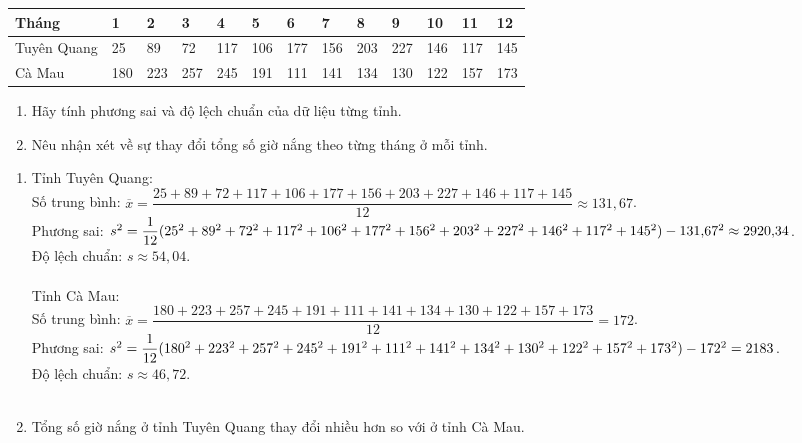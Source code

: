 \begin{bt}%
	\begin{center}
		\begin{tabular}{|m{1.5cm}|m{.4cm}|m{.4cm}|m{.4cm}|m{.4cm}|m{.4cm}|m{.4cm}|m{.4cm}|m{.4cm}|m{.4cm}|m{.4cm}|m{.4cm}|m{.4cm}|}
			\hline
			Tháng & 1 & 2 & 3 & 4 & 5 & 6 & 7 & 8 & 9 & 10 & 11 & 12 \\
			\hline
			Tuyên Quang & 25 & 89 & 72 & 117 & 106 & 177 & 156 & 203 & 227 & 146 & 117 & 145 \\
			\hline
			Cà Mau & 180 & 223 & 257 & 245 & 191 & 111 & 141 & 134 & 130 & 122 & 157 & 173 \\
			\hline
		\end{tabular} 
	\end{center}
	\begin{enumerate}
		\item [a)] Hãy tính phương sai và độ lệch chuẩn của dữ liệu từng tỉnh. \\
		\item [b)]Nêu nhận xét về sự thay đổi tổng số giờ nắng theo từng tháng ở mỗi tỉnh.
	\end{enumerate}
	
	
	\loigiai
	{
		\begin{enumerate}
			\item [a)] Tỉnh Tuyên Quang: \\
			Số trung bình: $\overline{x} = \dfrac{25 + 89 + 72 + 117 + 106 + 177 + 156 + 203 + 227 + 146 + 117 + 145}{12} \approx 131{,}67$. \\
			Phương sai: $s^2 = \\
			\dfrac{1}{12}(25^2 + 89^2 + 72^2 + 117^2 + 106^2 + 177^2 + 156^2 + 203^2 + 227^2 + 146^2 + 117^2 + 145^2) - 131{,}67^2\\
			\approx 2920{,}34$. \\
			Độ lệch chuẩn: $s \approx 54{,}04$. \\ \\
			Tỉnh Cà Mau: \\
			Số trung bình: $\overline{x} = \dfrac{180 + 223 + 257 + 245 + 191 + 111 + 141 + 134 + 130 + 122 + 157 + 173}{12} = 172$. \\
			Phương sai: $s^2 \\
			= \dfrac{1}{12}(180^2 + 223^2 + 257^2 + 245^2 + 191^2 + 111^2 + 141^2 + 134^2 + 130^2 + 122^2 + 157^2 + 173^2) - 172^2 \\
			= 2183$. \\
			Độ lệch chuẩn: $s \approx 46{,}72$. \\ \\
			\item[b)]Tổng số giờ nắng ở tỉnh Tuyên Quang thay đổi nhiều hơn so với ở tỉnh Cà Mau.
		\end{enumerate}
	}
\end{bt}

